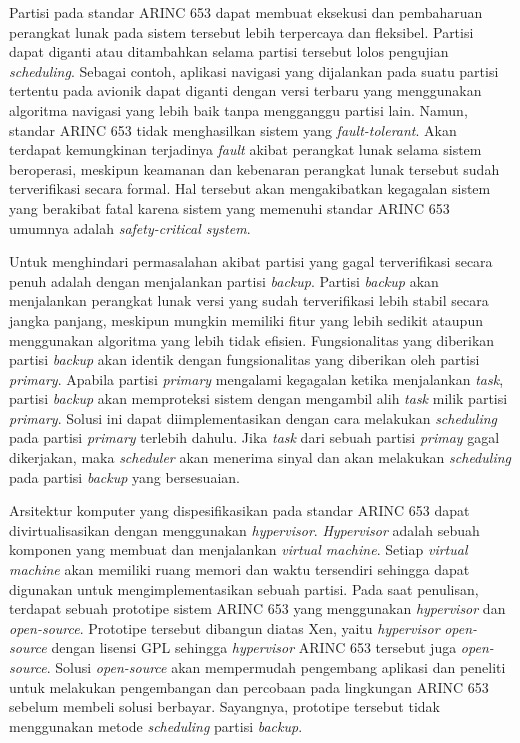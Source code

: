 Partisi pada standar ARINC 653 dapat membuat eksekusi dan pembaharuan perangkat lunak pada sistem tersebut lebih terpercaya dan fleksibel.
Partisi dapat diganti atau ditambahkan selama partisi tersebut lolos pengujian \textit{scheduling}.
Sebagai contoh, aplikasi navigasi yang dijalankan pada suatu partisi tertentu pada avionik dapat diganti dengan versi terbaru yang menggunakan algoritma navigasi yang lebih baik tanpa mengganggu partisi lain.
Namun, standar ARINC 653 tidak menghasilkan sistem yang \textit{fault-tolerant}.
Akan terdapat kemungkinan terjadinya \textit{fault} akibat perangkat lunak selama sistem beroperasi, meskipun keamanan dan kebenaran perangkat lunak tersebut sudah terverifikasi secara formal.
Hal tersebut akan mengakibatkan kegagalan sistem yang berakibat fatal karena sistem yang memenuhi standar ARINC 653 umumnya adalah \textit{safety-critical system}.

Untuk menghindari permasalahan akibat partisi yang gagal terverifikasi secara penuh adalah dengan menjalankan partisi \textit{backup}.
Partisi \textit{backup} akan menjalankan perangkat lunak versi yang sudah terverifikasi lebih stabil secara jangka panjang, meskipun mungkin memiliki fitur yang lebih sedikit ataupun menggunakan algoritma yang lebih tidak efisien.
Fungsionalitas yang diberikan partisi \textit{backup} akan identik dengan fungsionalitas yang diberikan oleh partisi \textit{primary}.
Apabila partisi \textit{primary} mengalami kegagalan ketika menjalankan \textit{task}, partisi \textit{backup} akan memproteksi sistem dengan mengambil alih \textit{task} milik partisi \textit{primary}.
Solusi ini dapat diimplementasikan dengan cara melakukan \textit{scheduling} pada partisi \textit{primary} terlebih dahulu.
Jika \textit{task} dari sebuah partisi \textit{primay} gagal dikerjakan, maka \textit{scheduler} akan menerima sinyal dan akan melakukan \textit{scheduling} pada partisi \textit{backup} yang bersesuaian.

Arsitektur komputer yang dispesifikasikan pada standar ARINC 653 dapat divirtualisasikan dengan menggunakan \textit{hypervisor}.
\textit{Hypervisor} adalah sebuah komponen yang membuat dan menjalankan \textit{virtual machine}.
Setiap \textit{virtual machine} akan memiliki ruang memori dan waktu tersendiri sehingga dapat digunakan untuk mengimplementasikan sebuah partisi.
Pada saat penulisan, terdapat sebuah prototipe sistem ARINC 653 yang menggunakan \textit{hypervisor} dan \textit{open-source}.
Prototipe tersebut dibangun diatas Xen, yaitu \textit{hypervisor} \textit{open-source} dengan lisensi GPL sehingga \textit{hypervisor} ARINC 653 tersebut juga \textit{open-source}.
Solusi \textit{open-source} akan mempermudah pengembang aplikasi dan peneliti untuk melakukan pengembangan dan percobaan pada lingkungan ARINC 653 sebelum membeli solusi berbayar.
Sayangnya, prototipe tersebut tidak menggunakan metode \textit{scheduling} partisi \textit{backup}.

